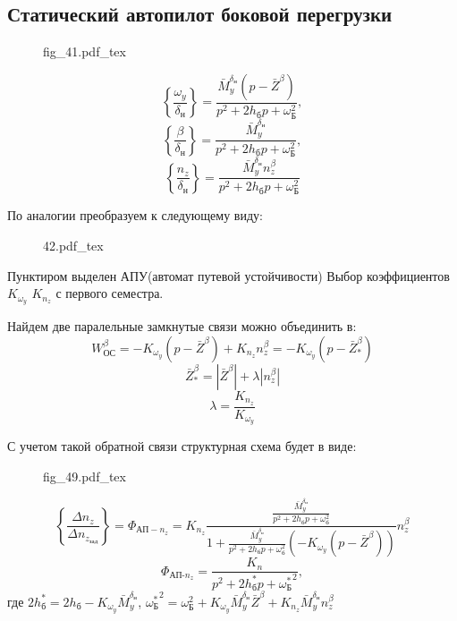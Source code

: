 \documentclass{article}
\newcommand{\incfig}[1]{
    {#1.pdf_tex}
}
\begin{document}
\subsection{Статический автопилот боковой перегрузки}

\begin{figure}[H]
	\centering
	{fig_41.pdf_tex}
\end{figure}

\[
	\left\{\frac{\omega_y}{\delta_\text{н}}\right\} = \frac{\bar{M}_y^{\delta_\text{н}}(p - \bar{Z}^\beta)}{ p^2 + 2 h_\text{б}p + \omega_\text{Б}^2 },
\]
\[
	\left\{ \frac{\beta}{\delta_\text{н}} \right\} = \frac{ \bar{M}_y^{\delta_\text{н}} }{ p^2 + 2 h_\text{б}p + \omega_\text{Б}^2 }    
	,\]
\[
	\left\{ \frac{n_z}{\delta_\text{н}} \right\} = \frac{ \bar{M}_y^{\delta_\text{н}} n_z^\beta }{ p^2 + 2 h_\text{б}p + \omega_\text{Б}^2 }    
\]

По аналогии преобразуем к следующему виду:

\begin{figure}[H]
	\centering
	{42.pdf_tex}
\end{figure}


Пунктиром выделен АПУ(автомат путевой устойчивости) 
Выбор коэффициентов $K_{\omega_y}$ $K_{n_z}$ с первого семестра.

Найдем две паралельные замкнутые связи можно объединить в: 
\[
	W_\text{ОС}^\beta = - K_{\omega_y} (p - \bar{Z}^\beta) + K_{n_z} n_z^\beta = - K_{\omega_y}(p - \bar{Z}_*^\beta)
\]
\[
	\bar{Z}_*^\beta = |\bar{Z}^\beta| + \lambda |n_z^\beta|
\]
\[
	\lambda = \frac{K_{n_z}}{K_{\omega_y}}
\]

С учетом такой обратной связи структурная схема будет в виде:

\begin{figure}[ht]
	\centering
	\incfig{fig_49}
	\label{fig:fig_49}
\end{figure}

\[
	\left\{\frac{\Delta n_z}{\Delta n_{z_\text{зад}}} \right\}  = \Phi_{\text{АП}-n_z} = K_{n_z}\frac{\frac{\bar{M}_y^{\delta_\text{н}}}{p^2 + 2 h_\text{б} p + \omega_\text{б}^2}}{1 +\frac{\bar{M}_y^{\delta_\text{н}}}{p^2 + 2 h_\text{б} p + \omega_\text{б}^2} (-K_{\omega_y}(p - \bar{Z}^\beta))}n_z^\beta  
\]
\[
	\Phi_{\text{АП-}n_z} =\frac{K_n}{ p^2 + 2 h_\text{б}^*p + {\omega_\text{Б}^*}^2  }, 
\]
где $2h_\text{б}^* = 2h_\text{б} - K_{\omega_y}\bar{M}_y^{\delta_\text{н}}$, ${\omega_\text{Б}^*}^2 = \omega_\text{Б}^2 + K_{\omega_y}\bar{M}_y^{\delta_\text{н}} \bar{Z}^\beta + K_{n_z} \bar{M}_y^{\delta_\text{н}} n_z^\beta $
\end{document}
